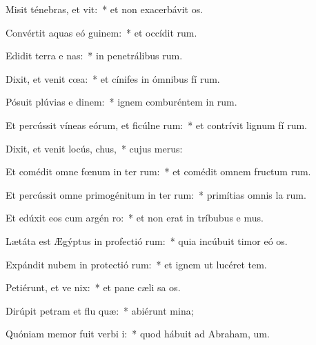 \item Misit ténebras, et vit:~* et non exacerbávit  os.
\item Convértit aquas eó  guinem:~* et occídit  rum.
\item Edidit terra e nas:~* in penetrálibus  rum.
\item Dixit, et venit cœa:~* et cínifes in ómnibus fí rum.
\item Pósuit plúvias e dinem:~* ignem comburéntem in  rum.
\item Et percússit víneas eórum, et ficúlne rum:~* et contrívit lignum fí rum.
\item Dixit, et venit locús,  chus,~* cujus   merus:
\item Et comédit omne fœnum in ter rum:~* et comédit omnem fructum  rum.
\item Et percússit omne primogénitum in ter rum:~* primítias omnis la rum.
\item Et edúxit eos cum argén  ro:~* et non erat in tríbubus e mus.
\item Lætáta est Ægýptus in profectió rum:~* quia incúbuit timor eó  os.
\item Expándit nubem in protectió rum:~* et ignem ut lucéret   tem.
\item Petiérunt, et ve nix:~* et pane cæli sa os.
\item Dirúpit petram et flu quæ:~* abiérunt   mina;
\item Quóniam memor fuit verbi  i:~* quod hábuit ad Abraham,  um.
